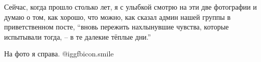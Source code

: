 Сейчас, когда прошло столько лет, я с улыбкой смотрю на эти две фотографии и
думаю о том, как хорошо, что можно, как сказал админ нашей группы в
приветственном посте, \enquote{вновь пережить нахлынувшие чувства, которые испытывали
тогда, – в те далекие тёплые дни.}

На фото я справа. @igg{fbicon.smile} 
